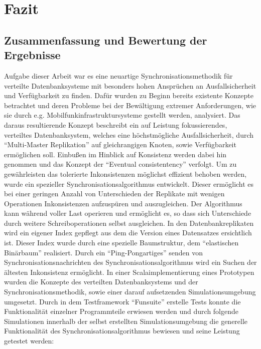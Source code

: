 \documentclass[a4paper,11pt,oneside,%
headsepline,												%
footsepline,												%
bibtotocnumbered									%
]{scrreprt}
\begin{document}
\chapter{Fazit}

\section{Zusammenfassung und Bewertung der Ergebnisse}
Aufgabe dieser Arbeit war es eine neuartige Synchronisationsmethodik für verteilte Datenbanksysteme mit besonders hohen Ansprüchen an Ausfallsicherheit und Verfügbarkeit zu finden. Dafür wurden zu Beginn bereits existente Konzepte betrachtet und deren Probleme bei der Bewältigung extremer Anforderungen, wie sie durch e.g. Mobilfunkinfrastruktursysteme gestellt werden, analysiert. Das daraus resultierende Konzept beschreibt ein auf Leistung fokussierendes, verteiltes Datenbanksystem, welches eine höchstmögliche Ausfallsicherheit, durch \enquote{Multi-Master Replikation} auf gleichrangigen Knoten, sowie Verfügbarkeit ermöglichen soll. Einbußen im Hinblick auf Konsistenz werden dabei hin genommen und das Konzept der \enquote{Eventual consistentency} verfolgt. Um zu gewährleisten das tolerierte Inkonsistenzen möglichst effizient behoben werden, wurde ein spezieller Synchronisationsalgorithmus entwickelt. Dieser ermöglicht es bei einer geringen Anzahl von Unterschieden der Replikate  mit wenigen Operationen Inkonsistenzen  aufzuspüren und auszugleichen. Der Algorithmus kann während voller Last operieren und ermöglicht es, so dass sich Unterschiede durch weitere Schreiboperationen selbst ausgleichen. In den Datenbankreplikaten wird ein eigener Index gepflegt aus dem die Version eines Datensatzes ersichtlich ist. Dieser Index wurde durch eine spezielle Baumstruktur, dem \enquote{elastischen Binärbaum} realisiert. Durch ein \enquote{Ping-Pongartiges} senden von Synchronisationsnachrichten des Synchronisationsalgorithmus wird ein Suchen der ältesten Inkonsistenz ermöglicht. In einer Scalaimplementierung eines Prototypen wurden die Konzepte des verteilten Datenbanksystems und der Synchronisationsmethodik, sowie einer darauf aufsetzenden Simulationsumgebung umgesetzt. Durch in dem Testframework \enquote{Funsuite} erstelle Tests konnte die Funktionalität einzelner Programmteile erwiesen werden und durch folgende Simulationen innerhalb der selbst erstellten Simulationsumgebung die generelle Funktionalität des Synchronisationsalgorithmus bewiesen und seine Leistung getestet werden:
\end{document}
